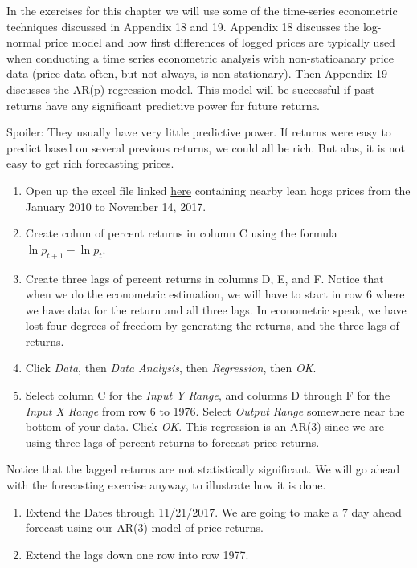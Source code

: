 \documentclass[
  letterpaper,
  DIV=11,
  numbers=noendperiod]{scrreprt}
\begin{document}
In the exercises for this chapter we will use some of the time-series
econometric techniques discussed in Appendix 18 and 19. Appendix 18
discusses the log-normal price model and how first differences of logged
prices are typically used when conducting a time series econometric
analysis with non-statioanary price data (price data often, but not
always, is non-stationary). Then Appendix 19 discusses the AR(p)
regression model. This model will be successful if past returns have any
significant predictive power for future returns.

Spoiler: They usually have very little predictive power. If returns were
easy to predict based on several previous returns, we could all be rich.
But alas, it is not easy to get rich forecasting prices.

\begin{enumerate}
\def\labelenumi{\arabic{enumi}.}
\item
  Open up the excel file linked \href{Excel-files/LeanHogs.xlsx}{here}
  containing nearby lean hogs prices from the January 2010 to November
  14, 2017.
\item
  Create colum of percent returns in column C using the formula
  \(\ln{p_{t+1}} - \ln{p_{t}}\).
\item
  Create three lags of percent returns in columns D, E, and F. Notice
  that when we do the econometric estimation, we will have to start in
  row 6 where we have data for the return and all three lags. In
  econometric speak, we have lost four degrees of freedom by generating
  the returns, and the three lags of returns.
\item
  Click \emph{Data}, then \emph{Data Analysis}, then \emph{Regression},
  then \emph{OK}.
\item
  Select column C for the \emph{Input Y Range}, and columns D through F
  for the \emph{Input X Range} from row 6 to 1976. Select \emph{Output
  Range} somewhere near the bottom of your data. Click \emph{OK}. This
  regression is an AR(3) since we are using three lags of percent
  returns to forecast price returns.
\end{enumerate}

Notice that the lagged returns are not statistically significant. We
will go ahead with the forecasting exercise anyway, to illustrate how it
is done.

\begin{enumerate}
\def\labelenumi{\arabic{enumi}.}
\setcounter{enumi}{5}
\item
  Extend the Dates through 11/21/2017. We are going to make a 7 day
  ahead forecast using our AR(3) model of price returns.
\item
  Extend the lags down one row into row 1977.
\end{enumerate}
\end{document}
